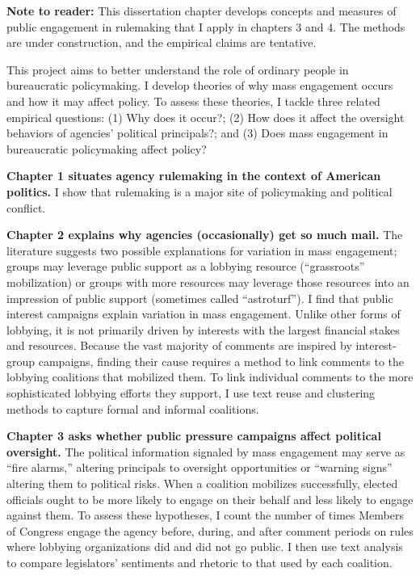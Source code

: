 \documentclass[
      12pt,
        ]{article}
\begin{document}







  \newpage

\noindent 
 
   
   
\textbf{Note to reader:} This dissertation chapter develops concepts and measures of public engagement in rulemaking that I apply in chapters 3 and 4. The methods are under construction, and the empirical claims are tentative.

This project aims to better understand the role of ordinary people in bureaucratic policymaking.
I develop theories of why mass engagement occurs and how it may affect policy. To assess these theories, I tackle three related empirical questions: (1) Why does it occur?; (2) How does it affect the oversight behaviors of agencies' political principals?; and
(3) Does mass engagement in bureaucratic policymaking affect policy?

\textbf{Chapter 1 situates agency rulemaking in the context of American politics.} I show that rulemaking is a major site of policymaking and political conflict.

\textbf{Chapter 2 explains why agencies (occasionally) get so much mail.}
The literature suggests two possible explanations for variation in mass engagement; groups may leverage public support as a lobbying resource (``grassroots'' mobilization) or groups with more resources may leverage those resources into an impression of public support (sometimes called ``astroturf'').
I find that public interest campaigns explain variation in mass engagement. Unlike other forms of lobbying, it is not primarily driven by interests with the largest financial stakes and resources.
Because the vast majority of comments are inspired by interest-group campaigns, finding their cause requires a method to link comments to the lobbying coalitions that mobilized them. To link individual comments to the more sophisticated lobbying efforts they support, I use text reuse and clustering methods to capture formal and informal coalitions.

\textbf{Chapter 3 asks whether public pressure campaigns affect political oversight.} The political information signaled by mass engagement may serve as ``fire alarms,'' altering principals to oversight opportunities or ``warning signs'' altering them to political risks.
When a coalition mobilizes successfully,
elected officials ought to be more likely to engage on their behalf and less likely to engage against them.
To assess these hypotheses, I count the number of times Members of Congress engage the agency before, during, and after comment periods on rules where lobbying organizations did and did not go public. I then use text analysis to compare legislators' sentiments and rhetoric to that used by each coalition.
\end{document}
